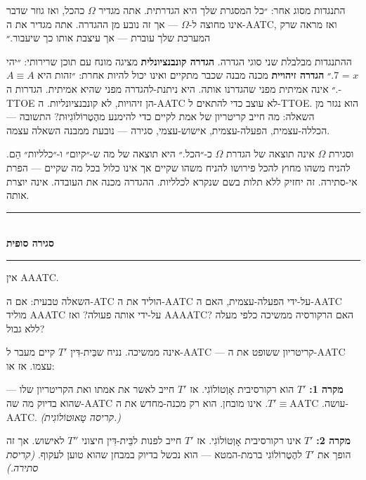 \documentclass[10pt, openany, oneside]{book}
\renewcommand{\normalsize}{\fontsize{10}{13}\selectfont}
\begin{document}
התנגדות מסוג אחר: ״כל המסגרת שלך היא הגדרתית. אתה מגדיר $\Omega$ כהכל, ואז גוזר שדבר אינו מחוצה ל-$\Omega$ — אך זה נובע מן ההגדרה. אתה מגדיר את ה-AATC, ואז מראה שרק המערכת שלך עוברת — אך עיצבת אותו כך שיעבור.״

ההתנגדות מבלבלת שני סוגי הגדרה. \textbf{הגדרה קונבנציונלית} מציגה מונח עם תוכן שרירותי: ״יהי $x$ = 7.״ \textbf{הגדרה זיהויית} מכנה מבנה שכבר מתקיים ואינו יכול להיות אחרת: ״זהות היא $A \equiv A$.״ אינה אמיתית מפני שהגדרנו אותה. היא ניתנת-להגדרה מפני שהיא אמיתית. הגדרות ה-TTOE הן זיהויות, לא קונבנציונליות. ה-AATC לא עוצב כדי להתאים ל-TTOE. הוא נגזר מן השאלה: מה חייב קריטריון של אמת לקיים כדי להימנע מהֶטֶרוֹלוֹגִיוּת? התשובה — הכללה-עצמית, הפעלה-עצמית, אישוש-עצמי, סגירה — נובעת ממבנה השאלה עצמה.

וסגירת $\Omega$ אינה תוצאה של הגדרת $\Omega$ כ-״הכל.״ היא תוצאה של מה ש-״קיום״ ו-״כלליות״ הֵם. להניח משהו מחוץ להכל פירושו להניח משהו שקיים אך אינו כלול בכל מה שקיים — הפרת אי-סתירה. זה יחזיק ללא תלות בשם שנקרא לכלליות. ההגדרה מכנה את העובדה. אינה יוצרת אותה.


\vspace{1.5em}

\begin{center}
    \rule{0.3\textwidth}{0.4pt}\\[0.5em]
    {\normalsize\bfseries\textsc{סגירה סופית}}\\[0.3em]
    \rule{0.3\textwidth}{0.4pt}
\end{center}

\vspace{1em}

\noindent אין AAATC.

השאלה טבעית: אם ה-ATC הוליד את ה-AATC על-ידי הפעלה-עצמית, האם ה-AATC מוליד AAATC על-ידי אותה פעולה? ואז AAAATC? האם הרקורסיה ממשיכה כלפי מעלה ללא גבול?

אינה ממשיכה. נניח שבֵּית-דִּין $T'$ קיים מעבר ל-AATC — קריטריון ששופט את ה-AATC עצמו. אז או:

\textbf{מקרה 1:} $T'$ הוא רקורסיבית אָוְטוֹלוֹגִי. אז $T'$ חייב לאשר את אמתו ואת הקריטריון שלו — שהוא בדיוק מה שה-AATC עושה. $T' \equiv \text{AATC}$. אינו מובחן. הוא רק מכנה-מחדש את ה-AATC. \textit{(קריסה טָאוּטוֹלוֹגִית.)}

\textbf{מקרה 2:} $T'$ אינו רקורסיבית אָוְטוֹלוֹגִי. אז $T'$ חייב לפנות לבֵּית-דִּין חיצוני $T''$ לאישוש. אך זה הופך את $T'$ להֶטֶרוֹלוֹגִי ברמת-המטא — הוא נכשל בדיוק במבחן שהוא טוען לעקוף. \textit{(קריסת סתירה.)}
\end{document}

